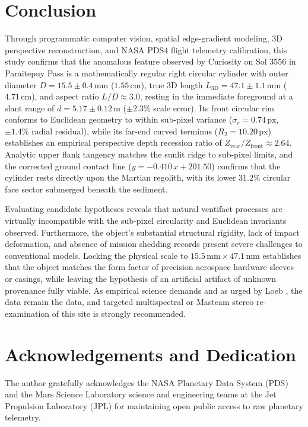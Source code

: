 \documentclass[11pt,a4paper]{article}
\begin{document}
\section{Conclusion}

Through programmatic computer vision, spatial edge-gradient modeling, 3D perspective reconstruction, and NASA PDS4 flight telemetry calibration, this study confirms that the anomalous feature observed by Curiosity on Sol 3556 in Paraitepuy Pass is a mathematically regular right circular cylinder with outer diameter $D = 15.5 \pm 0.4\,\text{mm}$ ($1.55\,\text{cm}$), true 3D length $L_{\text{3D}} = 47.1 \pm 1.1\,\text{mm}$ ($4.71\,\text{cm}$), and aspect ratio $L/D \approx 3.0$, resting in the immediate foreground at a slant range of $d = 5.17 \pm 0.12\,\text{m}$ ($\pm 2.3\%$ scale error). Its front circular rim conforms to Euclidean geometry to within sub-pixel variance ($\sigma_r = 0.74\,\text{px}$, $\pm 1.4\%$ radial residual), while its far-end curved terminus ($R_2 = 10.20\,\text{px}$) establishes an empirical perspective depth recession ratio of $Z_{\text{rear}} / Z_{\text{front}} \approx 2.64$. Analytic upper flank tangency matches the sunlit ridge to sub-pixel limits, and the corrected ground contact line ($y = -0.410\,x + 201.50$) confirms that the cylinder rests directly upon the Martian regolith, with its lower $31.2\%$ circular face sector submerged beneath the sediment.

Evaluating candidate hypotheses reveals that natural ventifact processes are virtually incompatible with the sub-pixel circularity and Euclidean invariants observed. Furthermore, the object's substantial structural rigidity, lack of impact deformation, and absence of mission shedding records present severe challenges to conventional models. Locking the physical scale to $15.5\,\text{mm} \times 47.1\,\text{mm}$ establishes that the object matches the form factor of precision aerospace hardware sleeves or casings, while leaving the hypothesis of an artificial artifact of unknown provenance fully viable. As empirical science demands and as urged by Loeb \cite{loeb2022}, the data remain the data, and targeted multispectral or Mastcam stereo re-examination of this site is strongly recommended.

\section*{Acknowledgements and Dedication}
The author gratefully acknowledges the NASA Planetary Data System (PDS) and the Mars Science Laboratory science and engineering teams at the Jet Propulsion Laboratory (JPL) for maintaining open public access to raw planetary telemetry.
\end{document}
